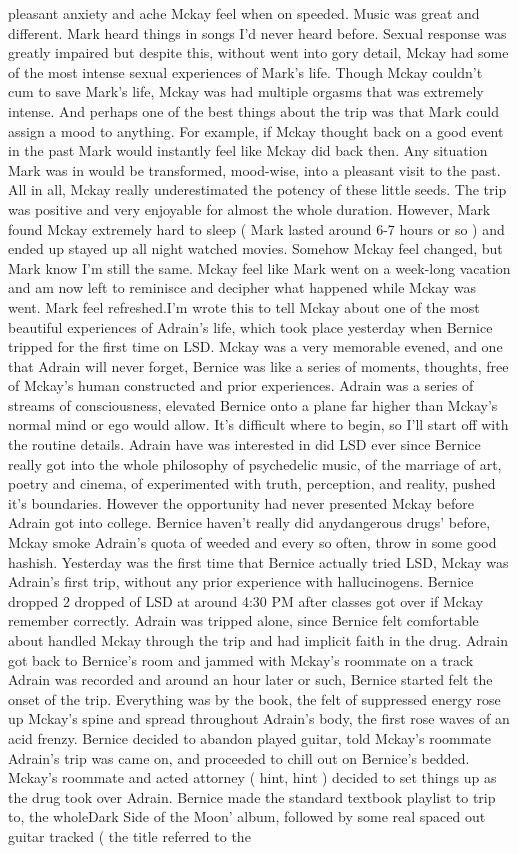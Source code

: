 \documentclass[12pt]{book}
\begin{document}
pleasant anxiety and ache Mckay feel when on speeded. Music was great and different. Mark heard things in songs I'd never heard before. Sexual response was greatly impaired but despite this, without went into gory detail, Mckay had some of the most intense sexual experiences of Mark's life. Though Mckay couldn't cum to save Mark's life, Mckay was had multiple orgasms that was extremely intense. And perhaps one of the best things about the trip was that Mark could assign a mood to anything. For example, if Mckay thought back on a good event in the past Mark would instantly feel like Mckay did back then. Any situation Mark was in would be transformed, mood-wise, into a pleasant visit to the past. All in all, Mckay really underestimated the potency of these little seeds. The trip was positive and very enjoyable for almost the whole duration. However, Mark found Mckay extremely hard to sleep ( Mark lasted around 6-7 hours or so ) and ended up stayed up all night watched movies. Somehow Mckay feel changed, but Mark know I'm still the same. Mckay feel like Mark went on a week-long vacation and am now left to reminisce and decipher what happened while Mckay was went. Mark feel refreshed.I'm wrote this to tell Mckay about one of the most beautiful experiences of Adrain's life, which took place yesterday when Bernice tripped for the first time on LSD. Mckay was a very memorable evened, and one that Adrain will never forget, Bernice was like a series of moments, thoughts, free of Mckay's human constructed and prior experiences. Adrain was a series of streams of consciousness, elevated Bernice onto a plane far higher than Mckay's normal mind or ego would allow. It's difficult where to begin, so I'll start off with the routine details. Adrain have was interested in did LSD ever since Bernice really got into the whole philosophy of psychedelic music, of the marriage of art, poetry and cinema, of experimented with truth, perception, and reality, pushed it's boundaries. However the opportunity had never presented Mckay before Adrain got into college. Bernice haven't really did anydangerous drugs' before, Mckay smoke Adrain's quota of weeded and every so often, throw in some good hashish. Yesterday was the first time that Bernice actually tried LSD, Mckay was Adrain's first trip, without any prior experience with hallucinogens. Bernice dropped 2 dropped of LSD at around 4:30 PM after classes got over if Mckay remember correctly. Adrain was tripped alone, since Bernice felt comfortable about handled Mckay through the trip and had implicit faith in the drug. Adrain got back to Bernice's room and jammed with Mckay's roommate on a track Adrain was recorded and around an hour later or such, Bernice started felt the onset of the trip. Everything was by the book, the felt of suppressed energy rose up Mckay's spine and spread throughout Adrain's body, the first rose waves of an acid frenzy. Bernice decided to abandon played guitar, told Mckay's roommate Adrain's trip was came on, and proceeded to chill out on Bernice's bedded. Mckay's roommate and acted attorney ( hint, hint ) decided to set things up as the drug took over Adrain. Bernice made the standard textbook playlist to trip to, the wholeDark Side of the Moon' album, followed by some real spaced out guitar tracked ( the title referred to the 
\end{document}

